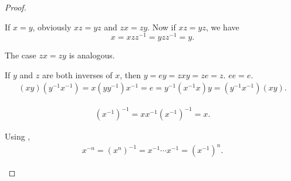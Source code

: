 \begin{proof}\mbox{}
  \begin{itemize}
     If \( x = y \), obviously \( xz = yz \) and \( zx = zy \). Now if \( xz = yz \), we have
    \begin{equation*}
      x = xzz^{-1} = yzz^{-1} = y.
    \end{equation*}

    The case \( zx = zy \) is analogous.

     If \( y \) and \( z \) are both inverses of \( x \), then \( y = ey = zxy = ze = z \).
     \( ee = e \).
    \begin{align*}
      (xy) (y^{-1} x^{-1})
      =
      x (y y^{-1}) x^{-1}
      =
      e
      =
      y^{-1} (x^{-1} x) y
      =
      (y^{-1} x^{-1}) (xy).
    \end{align*}

    \begin{align*}
      (x^{-1})^{-1}
      =
      x x^{-1} (x^{-1})^{-1}
      =
      x.
    \end{align*}

     Using ,
    \begin{align*}
      x^{-n}
      =
      (x^n)^{-1}
      =
      x^{-1} \cdots x^{-1}
      =
      (x^{-1})^n.
    \end{align*}
  \end{itemize}
\end{proof}

